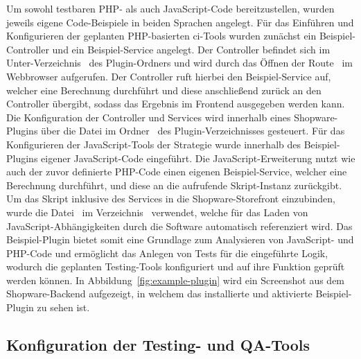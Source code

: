 Um sowohl testbaren PHP- als auch JavaScript-Code bereitzustellen, wurden jeweils eigene Code-Beispiele in beiden
Sprachen angelegt.
Für das Einführen und Konfigurieren der geplanten PHP-basierten \acrshort{ci}-Tools wurden zunächst ein
Beispiel-Controller und ein Beispiel-Service angelegt.
Der Controller befindet sich im Unter-Verzeichnis\  des Plugin-Ordners und wird durch das
Öffnen der Route\  im Webbrowser aufgerufen.
Der Controller ruft hierbei den Beispiel-Service auf, welcher eine Berechnung durchführt und diese anschließend zurück
an den Controller übergibt, sodass das Ergebnis im Frontend ausgegeben werden kann.
Die Konfiguration der Controller und Services wird innerhalb eines Shopware-Plugins über die Datei
 im Ordner\  des Plugin-Verzeichnisses gesteuert.
Für das Konfigurieren der JavaScript-Tools der Strategie wurde innerhalb des Beispiel-Plugins eigener
JavaScript-Code eingeführt.
Die JavaScript-Erweiterung nutzt wie auch der zuvor definierte PHP-Code einen eigenen Beispiel-Service, welcher eine
Berechnung durchführt, und diese an die aufrufende Skript-Instanz zurückgibt.
Um das Skript inklusive des Services in die Shopware-Storefront einzubinden, wurde die Datei\  im
Verzeichnis\  verwendet, welche für das Laden von
JavaScript-Abhängigkeiten durch die Software automatisch referenziert wird.
Das Beispiel-Plugin bietet somit eine Grundlage zum Analysieren von JavaScript- und PHP-Code und ermöglicht das Anlegen
von Tests für die eingeführte Logik, wodurch die geplanten Testing-Tools konfiguriert und auf ihre Funktion geprüft
werden können.
In Abbildung\ \ref{fig:example-plugin} wird ein Screenshot aus dem Shopware-Backend aufgezeigt, in welchem das
installierte und aktivierte Beispiel-Plugin zu sehen ist.

\subsection{Konfiguration der Testing- und QA-Tools} \label{subsec:04-implementation-2}

